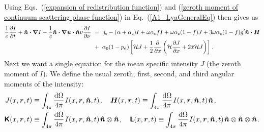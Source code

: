 \documentclass[fleqn,usenatbib]{mnras}
\begin{document}
Using Eqs.~(\ref{expansion of redistribution function}) and (\ref{zeroth moment of continuum scattering phase function}) in Eq.~(\ref{A1_LyaGeneralEq}) then gives us 
\begin{align}
    \dfrac{1}{c} \dfrac{\partial I}{\partial t} + \boldsymbol{\hat{n}} \boldsymbol{\cdot} \boldsymbol{\nabla} I - \dfrac{1}{c} \boldsymbol{\hat{n}} \boldsymbol{\cdot} \boldsymbol{\nabla} \boldsymbol{u}\boldsymbol{\cdot} \boldsymbol{\hat{n}} \nu \dfrac{\partial I}{\partial \nu} ~&=~ j_{\rm s} - (\alpha + \alpha_{\rm c}) I + \omega  \alpha_{\rm c} fI + \omega \alpha_{\rm c} (1-f) J + 3 \omega \alpha_{\rm c} (1-f) g' \boldsymbol{\hat{n}} \boldsymbol{\cdot} \boldsymbol{H} \nonumber \\ ~&+~ \alpha_0 (1 - p_{\rm d}) \left[\mathcal{H} J +  \dfrac{1}{2} \dfrac{\partial}{\partial x} \left( \mathcal{H} \dfrac{\partial J}{\partial x} +  2 \Bar{x} \mathcal{H} J\right) \right] \hspace{1 pt} \label{A1_LyaGeneralEq2} .
\end{align}
Next we want a single equation for the mean specific intensity $J$ (the zeroth moment of $I$). We define the usual zeroth, first, second, and third angular moments of the intensity:
\begin{align}
    J(x, \boldsymbol{r}, t) &\equiv  \int_{4\pi} \dfrac{\textrm{d}\Omega}{4 \pi}  \hspace{1 pt} I(x, \boldsymbol{r}, \boldsymbol{\hat{n}}, t) \hspace{1 pt} , \hspace{10 pt} \boldsymbol{H}(x, \boldsymbol{r}, t) \equiv \int_{4\pi} \dfrac{\textrm{d}\Omega}{4 \pi} \hspace{1 pt} I(x, \boldsymbol{r}, \boldsymbol{\hat{n}}, t) \hspace{1 pt} \boldsymbol{\hat{n}} \hspace{1 pt} , \nonumber \\ \textbf{\textsf{K}}(x, \boldsymbol{r}, t) &\equiv \int_{4\pi} \dfrac{\textrm{d}\Omega}{4 \pi} \hspace{1 pt} I(x, \boldsymbol{r}, \boldsymbol{\hat{n}}, t) \hspace{1 pt} \boldsymbol{\hat{n}} \otimes \boldsymbol{\hat{n}} \hspace{1 pt} , \hspace{10 pt} \textbf{\textsf{L}}(x, \boldsymbol{r}, t) \equiv \int_{4\pi} \dfrac{\textrm{d}\Omega}{4 \pi} \hspace{1 pt} I(x, \boldsymbol{r}, \boldsymbol{\hat{n}}, t) \hspace{1 pt} \boldsymbol{\hat{n}} \otimes \boldsymbol{\hat{n}} \otimes \boldsymbol{\hat{n}} \hspace{1 pt} \label{A1moments}.
\end{align}
\end{document}
